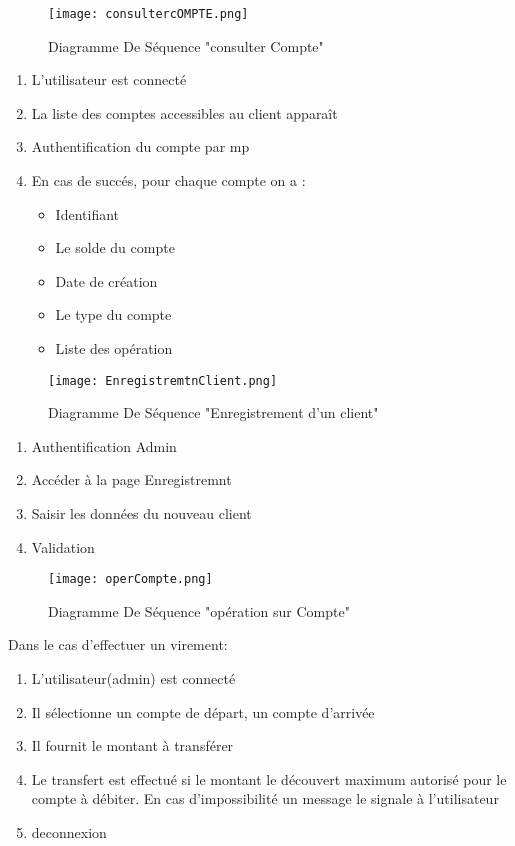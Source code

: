 \documentclass[../rapportdestage.tex]{subfiles}
\begin{document}
	\begin{figure}[bh]

\centering
\texttt{[image: consultercOMPTE.png]}  
\label{fig:ConsulterCompte}
\caption{Diagramme De Séquence "consulter Compte" }
\end{figure}
\begin{enumerate}


\item L'utilisateur est connecté
\item La liste des comptes accessibles au client apparaît
\item Authentification du compte par mp
\item En cas de succés, pour chaque compte on a :
\begin{itemize}
\item Identifiant
\item Le solde du compte
\item Date de création
\item Le type du compte
\item Liste des opération
\end{itemize}
\end{enumerate}

	\newpage





	\begin{figure}[bh]

\centering
\texttt{[image: EnregistremtnClient.png]}   
\label{fig:Enregistrement d'un client}
\caption{Diagramme De Séquence "Enregistrement d'un client" }
\end{figure}

\begin{enumerate}
\item Authentification Admin
\item Accéder à la page Enregistremnt
\item Saisir les données du nouveau client
\item Validation
\end{enumerate}
	\newpage
		
	

	\begin{figure}[bh]

\centering
\texttt{[image: operCompte.png]} 	 
\label{fig:les Operations sur compte}
\caption{Diagramme De Séquence "opération sur Compte" }
\end{figure}
Dans le cas d'effectuer un virement:
\begin{enumerate}
\item L'utilisateur(admin) est connecté
\item Il sélectionne un compte de départ, un compte d'arrivée
\item Il fournit le montant à transférer
\item Le transfert est effectué  si le montant  le découvert maximum autorisé pour le compte à débiter. En cas d'impossibilité un message le signale à l'utilisateur
\item deconnexion
\end{enumerate}
	\newpage		 
	
\end{document}

